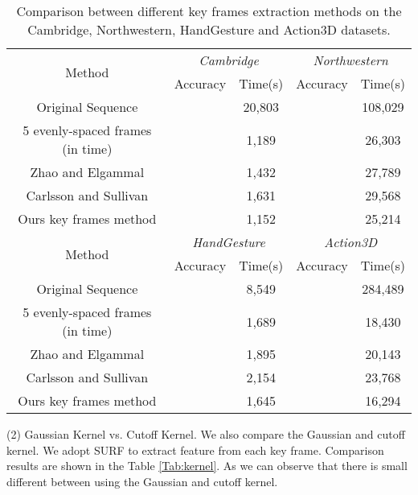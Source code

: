 \documentclass[5p]{elsarticle}
\begin{document}
\begin{table*}[!t]
	\centering
	\caption{Comparison between different key frames extraction methods on the Cambridge, Northwestern, HandGesture and Action3D datasets.}
\begin{tabular}{c|cc|cc}
		\hline
		\multirow{2}{*}{Method}    & \multicolumn{2}{|c|}{\emph{Cambridge}} & \multicolumn{2}{|c}{\emph{Northwestern}}  \\ \cline{2-5}
		& Accuracy                     & Time(s)  & Accuracy          & Time(s)  \\ \hline
		Original Sequence                                                &   & 20,803   &   & 108,029  \\
		5  evenly-spaced frames (in time)                        &   & 1,189      &   & 26,303   \\
		Zhao and Elgammal \cite{zhao2008information}  &       & 1,432    &   & 27,789   \\
		Carlsson and Sullivan \cite{carlsson2001action}   &       & 1,631    &   & 29,568   \\ \hline
		Ours key frames method                                      &        & 1,152    &   & 25,214   \\ \hline \hline
		
		\multirow{2}{*}{Method}    & \multicolumn{2}{|c|}{\emph{HandGesture}} & \multicolumn{2}{|c}{\emph{Action3D}} \\ \cline{2-5}
		& Accuracy                    & Time(s) &  Accuracy           & Time(s) \\ \hline
		Original Sequence                                                &  & 8,549   &   & 284,489 \\
		5  evenly-spaced frames (in time)                         &  & 1,689   &   & 18,430 \\
		Zhao and Elgammal \cite{zhao2008information}   &  & 1,895   &   & 20,143  \\
		Carlsson and Sullivan  \cite{carlsson2001action}   &  & 2,154   &   & 23,768  \\ \hline
		Ours key frames method                                       &  & 1,645   &   & 16,294 \\ \hline
	\end{tabular}
	\label{Tab:Comparison_key_or_not}
\end{table*}

\noindent (2) Gaussian Kernel vs. Cutoff Kernel.
We also compare the Gaussian and cutoff kernel.
We adopt  SURF to extract feature from each key frame.
Comparison results are shown in the Table \ref{Tab:kernel}.
As we can observe that there is small different between using the Gaussian and cutoff kernel.
\end{document}
